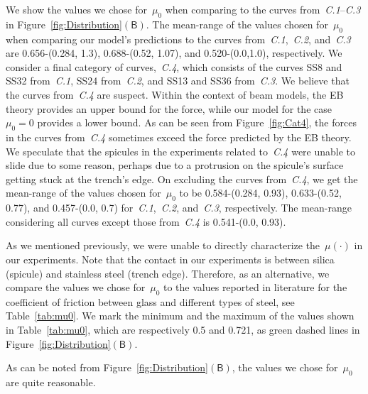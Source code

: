 \documentclass[preprint,10pt,times]{elsarticle}
\numberwithin{equation}{section}
\newcommand{\pr}[1]{\left( #1 \right)}
\newcommand{\subf}[1]{\pr{\textsf{#1}}}
\begin{document}
We show the values we chose for~$\mu_0$ when comparing to the curves
from~\textit{C.1}--\textit{C.3} in Figure~\ref{fig:Distribution}$\subf{B}$.
The mean-range of the values chosen for~$\mu_0$ when comparing our
model's predictions to the curves from~\textit{C.1},~\textit{C.2},
and~\textit{C.3} are 0.656-(0.284, 1.3), 0.688-(0.52, 1.07), and
0.520-(0.0,1.0), respectively. We consider a final category of curves,~\textit{C.4},
which consists of the curves SS8 and SS32 from~\textit{C.1}, SS24
from~\textit{C.2}, and SS13 and SS36 from~\textit{C.3}. We believe that
the curves from~\textit{C.4} are suspect. Within the context of
beam models, the EB theory provides an upper bound for the force,
while our model for the case~$\mu_0=0$ provides a lower bound. As
can be seen from Figure~\ref{fig:Cat4}, the forces in the curves
from~\textit{C.4} sometimes exceed the force predicted by the EB
theory. We speculate that the spicules in the experiments related
to~\textit{C.4} were unable to slide due to some reason, perhaps
due to a protrusion on the spicule's surface getting stuck at the
trench's edge. On excluding the curves from~\textit{C.4}, we get the
mean-range of the values chosen for~$\mu_0$ to be 0.584-(0.284,
0.93), 0.633-(0.52, 0.77), and 0.457-(0.0, 0.7) for~\textit{C.1},~\textit{C.2},
and~\textit{C.3}, respectively. The mean-range considering all
curves except those from~\textit{C.4} is 0.541-(0.0, 0.93).

As we mentioned previously, we were unable to directly characterize
the~$\mu(\cdot)$ in our experiments. Note that the contact in our
experiments is between silica (spicule) and stainless steel (trench
edge). Therefore, as an alternative, we compare the values we chose
for~$\mu_0$ to the values reported in literature for the coefficient
of friction between glass and different types of steel, see Table~\ref{tab:mu0}.
We mark the minimum and the maximum of the values shown in Table~\ref{tab:mu0},
which are respectively 0.5 and 0.721, as green dashed lines in Figure~\ref{fig:Distribution}$\subf{B}$.

As can be noted from Figure~\ref{fig:Distribution}$\subf{B}$, the
values we chose for~$\mu_0$ are quite reasonable.
\end{document}
